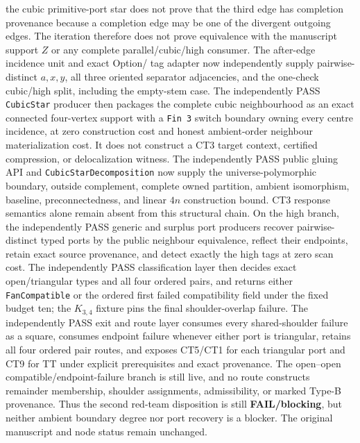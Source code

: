 \documentclass[11pt]{article}
\begin{document}
the cubic primitive-port star does not prove that the third edge has completion
provenance because a completion edge may be one of the divergent outgoing
edges.  The iteration
therefore
does not prove equivalence with the manuscript support $Z$ or any complete
parallel/cubic/high consumer.  The after-edge incidence unit and exact Option/
tag adapter now independently supply pairwise-distinct $a,x,y$, all three
oriented separator adjacencies, and the one-check cubic/high split, including
the empty-stem case.  The independently PASS \texttt{CubicStar} producer then
packages the complete cubic neighbourhood as an exact connected four-vertex
support with a \texttt{Fin 3} switch boundary owning every centre incidence,
at zero construction cost and honest ambient-order neighbour materialization
cost.  It does not construct a CT3 target context, certified compression, or
delocalization witness.  The independently PASS public gluing API and
\texttt{CubicStarDecomposition} now supply the universe-polymorphic boundary,
outside complement, complete owned partition, ambient isomorphism, baseline,
preconnectedness, and linear $4n$ construction bound.  CT3 response semantics
alone remain absent from this structural chain.  On the high branch, the independently PASS generic
and surplus port producers recover pairwise-distinct typed ports by the public
neighbour equivalence, reflect their endpoints, retain exact source
provenance, and detect exactly the high tags at zero scan cost.  The
independently PASS classification layer then decides exact open/triangular
types and all four ordered pairs, and returns either
\texttt{FanCompatible} or the ordered first failed compatibility field under
the fixed budget ten; the $K_{3,4}$ fixture pins the final shoulder-overlap
failure.  The independently PASS exit and route layer consumes every
shared-shoulder failure as a square, consumes endpoint failure whenever either
port is triangular, retains all four ordered pair routes, and exposes CT5/CT1
for each triangular port and CT9 for TT under explicit prerequisites and exact
provenance.  The open--open compatible/endpoint-failure branch is still live,
and no route constructs remainder membership, shoulder assignments,
admissibility, or marked Type-B provenance.  Thus the second red-team
disposition is still \textbf{FAIL/blocking}, but neither ambient boundary
degree nor port recovery is a blocker.  The original manuscript and node
status remain unchanged.
\end{document}
